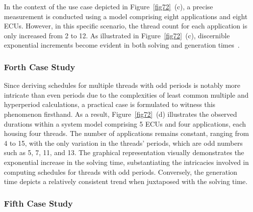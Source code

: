     In the context of the use case depicted in Figure~\ref{fig72}~(c), a precise measurement is conducted using a model comprising eight applications and eight ECUs. However, in this specific scenario, the thread count for each application is only increased from 2 to 12. As illustrated in Figure~\ref{fig72}~(c), discernible exponential increments become evident in both solving and generation times~\cite{askaripoor2023designer}.




     
    \subsubsection{Forth Case Study}
    
    Since deriving schedules for multiple threads with odd periods is notably more intricate than even periods due to the complexities of least common multiple and hyperperiod calculations, a practical case is formulated to witness this phenomenon firsthand. As a result, Figure~\ref{fig72}~(d) illustrates the observed durations within a system model comprising 5 ECUs and four applications, each housing four threads. The number of applications remains constant, ranging from 4 to 15, with the only variation in the threads' periods, which are odd numbers such as 5, 7, 11, and 13. The graphical representation visually demonstrates the exponential increase in the solving time, substantiating the intricacies involved in computing schedules for threads with odd periods. Conversely, the generation time depicts a relatively consistent trend when juxtaposed with the solving time.
    
    \subsubsection{Fifth Case Study}
    

